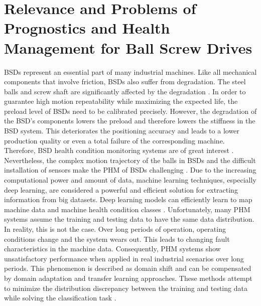 \section{Relevance and Problems of Prognostics and Health Management for Ball Screw Drives}
BSDs represent an essential part of many industrial machines. Like all mechanical components that involve friction, BSDs also suffer from degradation. The steel balls and screw shaft are significantly affected by the degradation \cite{Pandhare2021}. In order to guarantee high motion repeatability while maximizing the expected life, the preload level of BSDs need to be calibrated precisely. However, the degradation of the BSD's components lowers the preload and therefore lowers the stiffness in the BSD system. This deteriorates the positioning accuracy and leads to a lower production quality or even a total failure of the corresponding machine. Therefore, BSD health condition monitoring systems are of great interest \cite{Pandhare2021}. Nevertheless, the complex motion trajectory of the balls in BSDs and the difficult installation of sensors make the PHM of BSDs challenging \cite{LiPin2018}. Due to the increasing computational power and amount of data, machine learning techniques, especially deep learning, are considered a powerful and efficient solution for extracting information from big datasets. Deep learning models can efficiently learn to map machine data and machine health condition classes \cite{ZHAO2019213}. Unfortunately, many PHM systems assume the training and testing data to have the same data distribution. In reality, this is not the case. Over long periods of operation, operating conditions change and the system wears out. This leads to changing fault characteristics in the machine data. Consequently, PHM systems show unsatisfactory performance when applied in real industrial scenarios over long periods. This phenomenon is described as domain shift and can be compensated by domain adaptation and transfer learning approaches. These methods attempt to minimize the distribution discrepancy between the training and testing data while solving the classification task \cite{AZAMFAR2020103932}.


